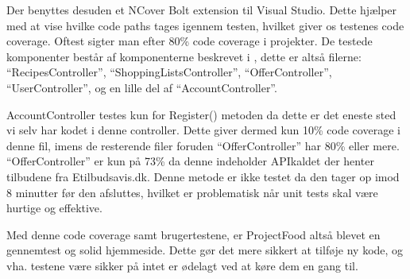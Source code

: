 Der benyttes desuden et NCover Bolt extension til Visual Studio. 
Dette hjælper med at vise hvilke code paths tages igennem testen, hvilket giver os testenes code coverage.
Oftest sigter man efter 80\% code coverage i projekter. \citep{Code_Coverage}
De testede komponenter består af komponenterne beskrevet i , dette er altså filerne: ``RecipesController'', ``ShoppingListsController'', ``OfferController'', ``UserController'',  og en lille del af ``AccountController''.

AccountController testes kun for Register() metoden da dette er det eneste sted vi selv har kodet i denne controller. 
Dette giver dermed kun 10\% code coverage i denne fil, imens de resterende filer foruden ``OfferController''  har 80\% eller mere.
``OfferController'' er kun på 73\% da denne indeholder APIkaldet der henter tilbudene fra Etilbudsavis.dk. 
Denne metode er ikke testet da den tager op imod 8 minutter før den afsluttes, hvilket er problematisk når unit tests skal være hurtige og effektive.

Med denne code coverage samt brugertestene, er ProjectFood altså blevet en gennemtest og solid hjemmeside.
Dette gør det mere sikkert at tilføje ny kode, og vha. testene være sikker på intet er ødelagt ved at køre dem en gang til.
